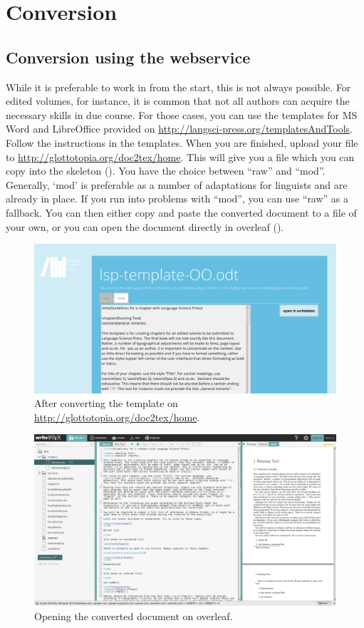 \chapter{Conversion} 
\section{Conversion using the webservice}
While it is preferable to work in \latex from the start, this is not always possible. For edited volumes, for instance, it is common that not all authors can acquire the necessary skills in due course. For those cases, you can use the templates for MS Word and LibreOffice provided on \url{http://langsci-press.org/templatesAndTools}. Follow the instructions in the templates. When you are finished, upload your file to \url{http://glottotopia.org/doc2tex/home}. This will give you a file which you can copy into the skeleton (). You have the choice between ``raw'' and ``mod''. Generally, `mod' is preferable as a number of adaptations for linguists and \lsp are already in place. If you run into problems with ``mod'', you can use  ``raw'' as a fallback. You can then either copy and paste the converted document to a file of your own, or you can open the document directly in overleaf ().

\begin{figure}
\includegraphics[width=\textwidth]{converter.png} 
\caption{After converting the template on \url{http://glottotopia.org/doc2tex/home}.}
\label{fig:conversion:glottotopia}
\end{figure}

\begin{figure}
\includegraphics[width=\textwidth]{conversionwritelatex.png} 
\caption{Opening the converted document on overleaf.}
\label{fig:conversion:overleaf}
\end{figure}

